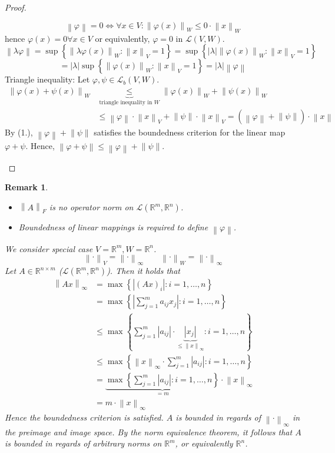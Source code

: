 \documentclass{article}
\newtheorem{remark}{Remark}  \numberwithin{remark}{section}
\newcommand{\set}[1]{\left\{#1\right\}}
\newcommand{\norm}[1]{\left\|#1\right\|}
\newcommand{\card}[1]{\left|#1\right|}
\begin{document}
\begin{proof}
\begin{enumerate}
      \[ \norm\varphi = 0 \iff \forall x \in V: \norm{\varphi(x)}_W \leq 0 \cdot \norm{x}_W \]
      hence $\varphi(x) = 0 \forall x \in V$ or equivalently, $\varphi = 0$ in $\mathcal L(V, W)$.
      \[ \norm{\lambda \varphi} = \sup\set{\norm{\lambda \varphi(x)}_W: \norm{x}_V = 1} = \sup\set{\card{\lambda} \norm{\varphi(x)}_W: \norm{x}_V = 1} \]
      \[ = \card{\lambda} \sup\set{\norm{\varphi(x)}_W: \norm{x}_V = 1} = \card{\lambda} \norm{\varphi} \]
      Triangle inequality:
      Let $\varphi, \psi \in \mathcal L_b(V,W)$.
      \begin{align*}
        \norm{\varphi(x) + \psi(x)}_W
          &\underbrace{\leq}_{\text{triangle inequality in } W} \norm{\varphi(x)}_W + \norm{\psi(x)}_W \\
          &\leq \norm \varphi \cdot \norm{x}_V + \norm \psi \cdot \norm{x}_V = (\norm{\varphi} + \norm{\psi}) \cdot \norm{x}
      \end{align*}
      By (1.), $\norm{\varphi} + \norm{\psi}$ satisfies the boundedness criterion for the linear map $\varphi + \psi$.
      Hence, $\norm{\varphi + \psi} \leq \norm{\varphi} + \norm{\psi}$.
  \end{enumerate}
\end{proof}

\begin{remark}
  \begin{itemize}
    \item $\norm{A}_F$ is no operator norm on $\mathcal L(\mathbb R^m, \mathbb R^n)$.
    \item Boundedness of linear mappings is required to define $\norm{\varphi}$.
  \end{itemize}
  We consider special case $V = \mathbb R^m, W = \mathbb R^n$.
  \[ \norm{\cdot}_V = \norm{\cdot}_\infty \qquad \norm{\cdot}_W = \norm{\cdot}_\infty \]
  Let $A \in \mathbb R^{n\times m}$ ($\mathcal L(\mathbb R^m, \mathbb R^n)$).
  Then it holds that
  \begin{align*}
    \norm{Ax}_\infty
      &= \max\set{\card{(Ax)_i}: i = 1, \dots, n} \\
      &= \max\set{\card{\sum_{j=1}^m a_{ij} x_j}: i = 1, \dots, n} \\
      &\leq \max\set{\sum_{j=1}^m \card{a_{ij}} \cdot \underbrace{\card{x_j}}_{\leq \norm{x}_{\infty}}: i = 1, \dots, n} \\
      &\leq \max\set{\norm{x}_\infty \cdot \sum_{j=1}^m \card{a_{ij}}: i = 1, \dots, n} \\
      &= \underbrace{\max\set{\sum_{j=1}^m \card{a_{ij}}: i = 1, \dots, n}}_{= m} \cdot \norm{x}_\infty \\
      &= m \cdot \norm{x}_\infty
  \end{align*}
  Hence the boundedness criterion is satisfied.
  $A$ is bounded in regards of $\norm{\cdot}_\infty$ in the preimage and image space.
  By the norm equivalence theorem, it follows that $A$ is bounded in regards of arbitrary norms on $\mathbb R^m$, or equivalently $\mathbb R^n$.
\end{remark}
\end{document}

